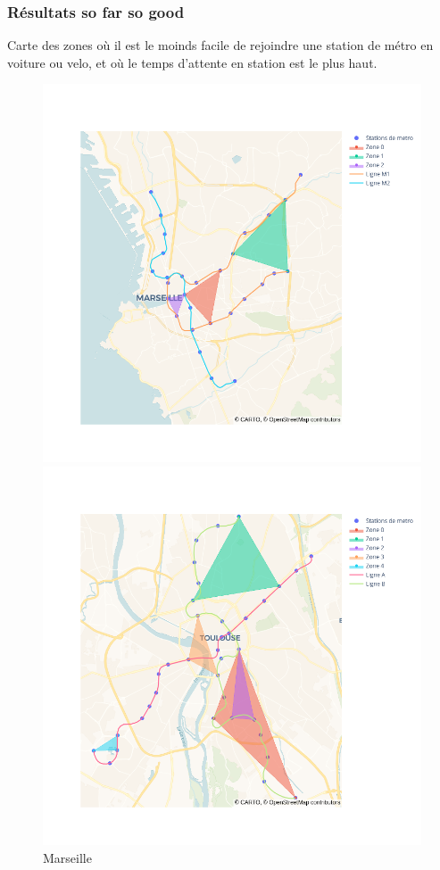 \documentclass{beamer}
\begin{document}
\begin{frame}
    \frametitle{Résultats so far so good}
    Carte des zones où il est le moinds facile de rejoindre une station de métro en voiture ou velo,
    et où le temps d'attente en station est le plus haut.

    \begin{figure}[h]
        \begin{minipage}[c]{.42\linewidth}
            \centering
            \includegraphics[width=1.1\textwidth]{../../Code/images/marseille.png}
            \caption{Marseille}
        \end{minipage}
        \hfill
        \begin{minipage}[c]{.42\linewidth}
            \centering
            \includegraphics[width=1\textwidth]{../../Code/images/toulouse.png}

\end{minipage}
\end{figure}
\end{frame}
\end{document}
